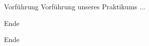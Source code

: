 \documentclass{beamer}
\begin{document}
\begin{frame}{Vorführung}
	Vorführung unseres Praktikums ...
\end{frame}	

\begin{frame}{Ende}
	\begin{center}\huge Ende\end{center}
\end{frame}





\end{document}
